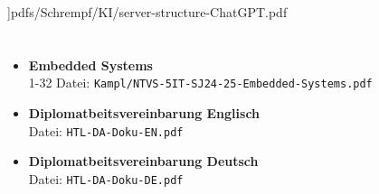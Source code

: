 \documentclass[
    headings=optiontotocandhead,%
    twoside,
    numbers=noenddot,%
    12pt, %
    titlepage, %
    parskip=full, %
    listof=leveldown, 
    numbers=noenddot, %
    a4paper,DIV=14,
    BCOR=15mm,
]{scrbook}
\makeatletter
\newcommand*{\the@orig@section}{}
\let\the@orig@section\section
\renewcommand*{\section}{%
  \clearpage
  \the@orig@section
}
\makeatother
\begin{document}
 ]{pdfs/Schrempf/KI/server-structure-ChatGPT.pdf}
%
{}

%



\translatelet{}
\section{\app}

\begin{itemize}

\item \textbf{Embedded
Systems}\\  1-32   Datei: \texttt{Kampl/NTVS-5IT-SJ24-25-Embedded-Systems.pdf}
\item \textbf{Diplomatbeitsvereinbarung
Englisch}\\  Datei: \texttt{HTL-DA-Doku-EN.pdf}
\item \textbf{Diplomatbeitsvereinbarung
Deutsch}\\  Datei: \texttt{HTL-DA-Doku-DE.pdf}
\end{itemize}
\end{document}

